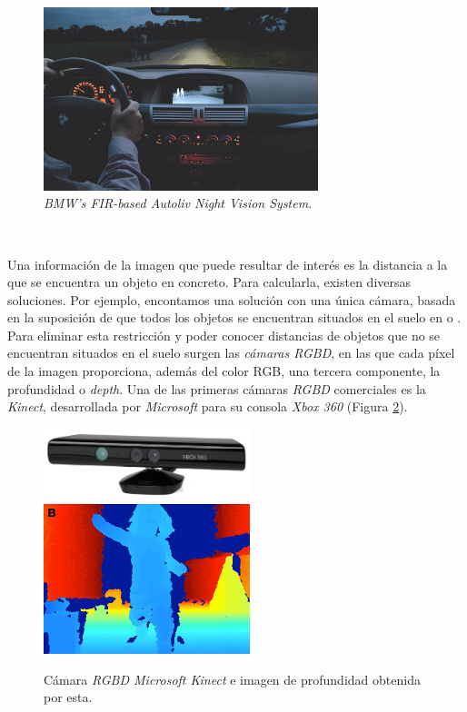 \begin{figure} [h!]
	\begin{center}
		\includegraphics[width=8cm]{figs/nightvision}
	\end{center}
	\caption{\textit{BMW's FIR-based Autoliv Night Vision System}.}
	\label{fig:nightvision}
\end{figure}\

Una información de la imagen que puede resultar de interés es la distancia a la que se encuentra un objeto en concreto. Para calcularla, existen diversas soluciones. Por ejemplo, encontamos una solución con una única cámara, basada en la suposición de que todos los objetos se encuentran situados en el suelo en \cite{vega19d} o \cite{distanceopencv}. Para eliminar esta restricción y poder conocer distancias de objetos que no se encuentran situados en el suelo surgen las \textit{cámaras RGBD}, en las que cada píxel de la imagen proporciona, además del color RGB, una tercera componente, la profundidad o \textit{depth}. Una de las primeras cámaras \textit{RGBD} comerciales es la \textit{Kinect}, desarrollada por \textit{Microsoft} para su consola \textit{Xbox 360} (Figura \ref{fig:kinect}).\\

\begin{figure} [h!]
	\begin{center}
		\includegraphics[width=6cm]{figs/kinect}\hspace{0.5cm}\includegraphics[width=6cm]{figs/depth}
	\end{center}
	\caption{Cámara \textit{RGBD Microsoft Kinect} e imagen de profundidad obtenida por esta.}
	\label{fig:kinect}
\end{figure}\

